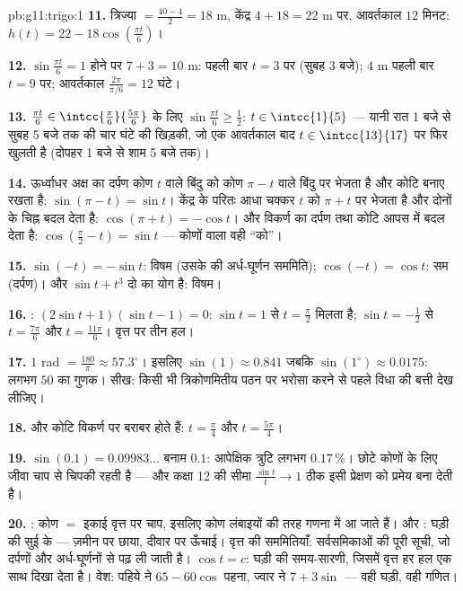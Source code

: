\begin{solution}{pb:g11:trigo:1}
\textbf{11.} त्रिज्या $= \frac{40 - 4}{2} = 18$ m, केंद्र $4 + 18 = 22$ m पर, आवर्तकाल $12$ मिनट:
$h(t) = 22 - 18\cos\left(\frac{\pi t}{6}\right)$।

\textbf{12.} $\sin\frac{\pi t}{6} = 1$ होने पर  $7 + 3 = 10$ m: पहली बार $t = 3$ पर (सुबह 3 बजे);
 $4$ m पहली बार $t = 9$ पर; आवर्तकाल $\frac{2\pi}{\pi/6} = 12$ घंटे।

\textbf{13.} $\frac{\pi t}{6} \in \intcc{\frac\pi6}{\frac{5\pi}{6}}$ के लिए $\sin\frac{\pi t}{6} \geq \frac12$: $t \in \intcc{1}{5}$ --- यानी रात 1 बजे से सुबह 5 बजे तक
की चार घंटे की खिड़की, जो एक आवर्तकाल बाद $t \in \intcc{13}{17}$ पर फिर खुलती है (दोपहर 1
बजे से शाम 5 बजे तक)।

\textbf{14.} ऊर्ध्वाधर अक्ष का दर्पण कोण $t$ वाले बिंदु को कोण $\pi - t$ वाले
बिंदु पर भेजता है और कोटि बनाए रखता है: $\sin(\pi - t) = \sin t$। केंद्र के परितः आधा चक्कर
$t$ को $\pi + t$ पर भेजता है और दोनों  के चिह्न बदल देता है:
$\cos(\pi + t) = -\cos t$। और विकर्ण का दर्पण  तथा कोटि आपस में बदल देता है: $\cos\left(\frac\pi2 - t\right) = \sin t$ --- 
कोणों वाला वही ``को''।

\textbf{15.} $\sin(-t) = -\sin t$: विषम (उसके  की अर्ध-घूर्णन सममिति); $\cos(-t) = \cos t$: सम
(दर्पण)। और $\sin t + t^3$ दो  का योग है: विषम।

\textbf{16.} : $(2\sin t + 1)(\sin t - 1) = 0$: $\sin t = 1$ से $t = \frac\pi2$ मिलता है; $\sin t = -\frac12$ से $t = \frac{7\pi}{6}$ और
$t = \frac{11\pi}{6}$। वृत्त पर तीन हल।

\textbf{17.} $1$ rad $= \frac{180}{\pi} \approx 57.3^\circ$। इसलिए $\sin(1) \approx 0.841$ जबकि $\sin(1^\circ) \approx
0.0175$: लगभग $50$ का गुणक।
सीख: किसी भी त्रिकोणमितीय पठन पर भरोसा करने से पहले विधा की बत्ती देख लीजिए।

\textbf{18.}  और कोटि विकर्ण पर बराबर होते हैं: $t = \frac\pi4$ और $t = \frac{5\pi}{4}$।

\textbf{19.} $\sin(0.1) = 0.09983\ldots$ बनाम $0.1$: आपेक्षिक त्रुटि लगभग $0.17\,\%$। छोटे कोणों के लिए
जीवा चाप से चिपकी रहती है --- और कक्षा 12 की सीमा $\frac{\sin t}{t} \to 1$ ठीक इसी प्रेक्षण को
प्रमेय बना देती है।

\textbf{20.} : कोण $=$ इकाई वृत्त पर चाप, इसलिए कोण लंबाइयों की तरह
गणना में आ जाते हैं।  और : घड़ी की सुई के  --- ज़मीन पर
छाया, दीवार पर ऊँचाई। वृत्त की सममितियाँ: सर्वसमिकाओं की पूरी सूची, जो
दर्पणों और अर्ध-घूर्णनों से पढ़ ली जाती है।  $\cos t = c$: घड़ी की
समय-सारणी, जिसमें वृत्त हर हल एक साथ दिखा देता है। वेश: पहिये ने $65 - 60\cos$ पहना,
ज्वार ने $7 + 3\sin$ --- वही घड़ी, वही गणित।
\end{solution}
